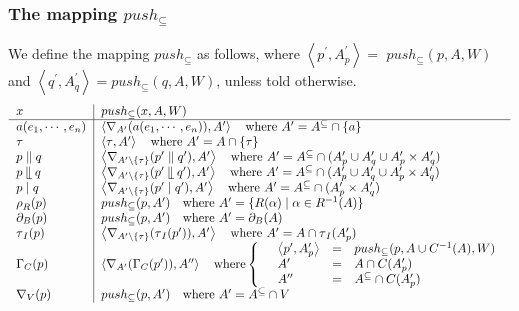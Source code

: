 \documentclass{article}
\begin{document}
\subsubsection{The mapping $push_{\subseteq }$}

We define the mapping $push_{\subseteq }$ as follows, where $\left\langle
p^{\prime },A_{p}^{\prime }\right\rangle =$ $push_{\subseteq }(p,A,W)$ and $%
\left\langle q^{\prime },A_{q}^{\prime }\right\rangle =push_{\subseteq
}(q,A,W)$, unless told otherwise.%
\[
\begin{tabular}{l|l}
$x$ & $push_{\subseteq }(x,A,W)$ \\ \hline
$a(e_{1},\cdots ,e_{n})$ & $\left\langle \nabla _{A^{\prime
}}(a(e_{1},\cdots ,e_{n})),A^{\prime }\right\rangle \text{ where }A^{\prime
}=A^{\subseteq }\cap \{a\}$ \\ 
$\tau $ & $\left\langle \tau ,A^{\prime }\right\rangle \text{ where }%
A^{\prime }=A\cap \{\tau \}$ \\ 
$p\parallel q$ & $\left\langle \nabla _{A^{\prime }\setminus \{\tau
\}}(p^{\prime }\parallel q^{\prime }),A^{\prime }\right\rangle \text{ where }%
A^{\prime }=A^{\subseteq }\cap (A_{p}^{\prime }\cup A_{q}^{\prime }\cup
A_{p}^{\prime }\times A_{q}^{\prime })$ \\ 
$p\mathbin{\mathrel{\llfloor}}q$ & $\left\langle \nabla _{A^{\prime
}\setminus \{\tau \}}(p^{\prime }\mathbin{\mathrel{\llfloor}}q^{\prime
}),A^{\prime }\right\rangle \text{ where }A^{\prime }=A^{\subseteq }\cap
(A_{p}^{\prime }\cup A_{q}^{\prime }\cup A_{p}^{\prime }\times A_{q}^{\prime
})$ \\ 
$p\mid q$ & $\left\langle \nabla _{A^{\prime }\setminus \{\tau \}}(p^{\prime
}\mid q^{\prime }),A^{\prime }\right\rangle \text{ where }A^{\prime
}=A^{\subseteq }\cap (A_{p}^{\prime }\times A_{q}^{\prime })$ \\ 
$\rho _{R}(p)$ & $push_{\subseteq }(p,A^{\prime })\text{ where }A^{\prime
}=\{R(\alpha )\mid \alpha \in R^{-1}(A)\}$ \\ 
$\partial _{B}(p)$ & $push_{\subseteq }(p,A^{\prime })\text{ where }%
A^{\prime }=\partial _{B}(A)$ \\ 
$\tau _{I}(p)$ & $\left\langle \nabla _{A^{\prime }\setminus \{\tau \}}(\tau
_{I}(p^{\prime })),A^{\prime }\right\rangle \text{ where }A^{\prime }=A\cap
\tau _{I}(A_{p}^{\prime })\text{ }$ \\ 
$\Gamma _{C}(p)$ & $\left\langle \nabla _{A^{\prime }}(\Gamma _{C}(p^{\prime
})),A^{\prime \prime }\right\rangle \text{ where}\left\{ \text{ }%
\begin{array}{lll}
\left\langle p^{\prime },A_{p}^{\prime }\right\rangle  & = & push_{\subseteq
}(p,A\cup C^{-1}(A),W) \\ 
A^{\prime } & = & A\cap C(A_{p}^{\prime }) \\ 
A^{\prime \prime } & = & A^{\subseteq }\cap C(A_{p}^{\prime })%
\end{array}%
\right. $ \\ 
$\nabla _{V}(p)$ & $push_{\subseteq }(p,A^{\prime })\text{ where }A^{\prime
}=A^{\subseteq }\cap V$%
\end{tabular}%
\]
\end{document}
